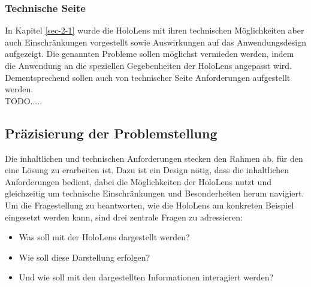 \subsubsection{Technische Seite}
\label{sec-3-1-2}
In Kapitel \ref{sec-2-1} wurde die HoloLens mit ihren technischen Möglichkeiten aber auch Einschränkungen vorgestellt sowie Auswirkungen auf das Anwendungsdesign aufgezeigt. Die genannten Probleme sollen möglichst vermieden werden, indem die Anwendung an die speziellen Gegebenheiten der HoloLens angepasst wird. Dementsprechend sollen auch von technischer Seite Anforderungen aufgestellt werden.\\



TODO.....


\subsection{Präzisierung der Problemstellung}
\label{sec-3-2}
Die inhaltlichen und technischen Anforderungen stecken den Rahmen ab, für den eine Lösung zu erarbeiten ist. Dazu ist ein Design nötig, dass die inhaltlichen Anforderungen bedient, dabei die Möglichkeiten der HoloLens nutzt und gleichzeitig um technische Einschränkungen und Besonderheiten herum navigiert. Um die Fragestellung zu beantworten, wie die HoloLens am konkreten Beispiel eingesetzt werden kann, sind drei zentrale Fragen zu adressieren:
\begin{itemize}
	\setlength{\itemsep}{-5pt}
	\item Was soll mit der HoloLens dargestellt werden?
	\item Wie soll diese Darstellung erfolgen?
	\item Und wie soll mit den dargestellten Informationen interagiert werden?
\end{itemize}

